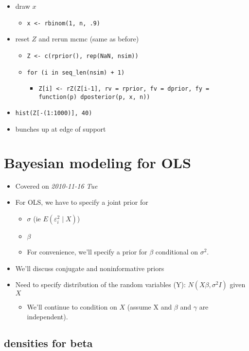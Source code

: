 \documentclass[11pt]{article}
\begin{document}
\begin{itemize}
\begin{itemize}
\item draw $x$
\begin{itemize}
\item \texttt{x <- rbinom(1, n, .9)}
\end{itemize}
\item reset $Z$ and rerun mcmc (same as before)
\begin{itemize}
\item \texttt{Z <- c(rprior(), rep(NaN, nsim))}
\item \texttt{for (i in seq\_len(nsim) + 1)}
\begin{itemize}
\item \texttt{Z[i] <- rZ(Z[i-1], rv = rprior, fv = dprior, fy = function(p) dposterior(p, x, n))}
\end{itemize}
\end{itemize}
\item \texttt{hist(Z[-(1:1000)], 40)}
\item bunches up at edge of support
\end{itemize}
\end{itemize}
\section{Bayesian modeling for OLS}
\label{sec-4}

\begin{itemize}
\item Covered on \textit{2010-11-16 Tue}
\item For OLS, we have to specify a joint prior for
\begin{itemize}
\item $\sigma$ (ie $E(\varepsilon_{i}^{2}\mid X)$)
\item $\beta$
\item For convenience, we'll specify a prior for $\beta$
        conditional on $\sigma^2$.
\end{itemize}
\item We'll discuss conjugate and noninformative priors
\item Need to specify distribution of the random variables (Y): $N(X\beta,
      \sigma^{2} I)$ given $X$
\begin{itemize}
\item We'll continue to condition on $X$ (assume X and $\beta$ and
        $\gamma$ are independent).
\end{itemize}
\end{itemize}
\subsection{densities for beta}
\label{sec-4-1}
\end{document}
